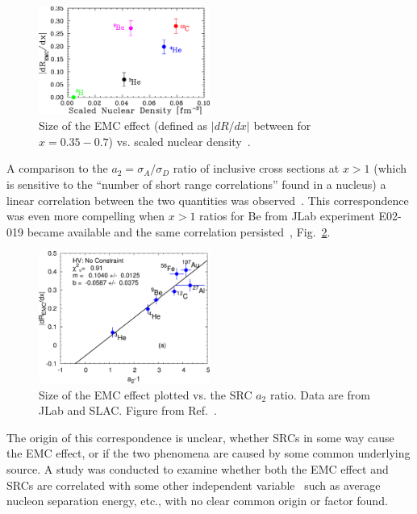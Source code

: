 \begin{figure}[htb]
  \includegraphics[width=0.5\textwidth]{plots/e03103_slopes.pdf}
  \caption{Size of the EMC effect (defined as $|dR/dx|$ between for $x=0.35-0.7$) vs. scaled nuclear
    density~\cite{Seely:2009gt}.}
  \label{fig:emc_jlab_hallc}
\end{figure}

A comparison to the $a_2=\sigma_A/\sigma_D$ ratio of
inclusive cross sections at $x>1$ (which is sensitive to the ``number of short range correlations''
found in a nucleus) a linear correlation between the two quantities was observed~\cite{Weinstein:2010rt}.
This correspondence was even more compelling when $x>1$ ratios for Be from JLab experiment E02-019 became
available and the same correlation persisted~\cite{Hen:2012fm}, Fig.~\ref{fig:emc_src_bff}.

\begin{figure}[htb]
  \includegraphics[width=0.5\textwidth]{plots/plotfit_all_norescaling_nocm_rean_final.pdf}
  \caption{Size of the EMC effect plotted vs. the SRC $a_2$ ratio. Data are from JLab and SLAC. Figure
  from Ref.~\cite{Arrington:2012ax}.}
  \label{fig:emc_src_bff}
\end{figure}

The origin of this correspondence is unclear, whether SRCs in some way cause the EMC effect, or if the two
phenomena are caused by some common underlying source.  A study was conducted to examine whether
both the EMC effect and SRCs are correlated with some other independent variable~\cite{Arrington:2012ax} such
as average nucleon separation energy, etc., with no clear common origin or factor found.


